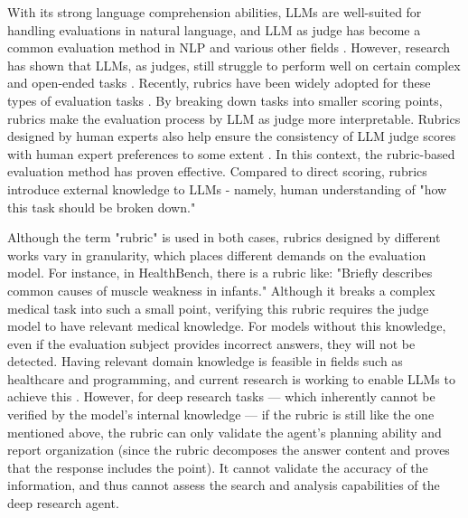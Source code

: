\documentclass[11pt]{article}
\begin{document}
With its strong language comprehension abilities, LLMs are well-suited for handling evaluations in natural language, and LLM as judge has become a common evaluation method in NLP and various other fields \citep{bavaresco2025llmsinsteadhumanjudges,gu2025surveyllmasajudge,zheng2023judgingllmasajudgemtbenchchatbot}. However, research has shown that LLMs, as judges, still struggle to perform well on certain complex and open-ended tasks \citep{li2025automatedcreativityevaluationlarge,chakrabarty2024artartificelargelanguage,marioriyad2025silentjudgeunacknowledgedshortcut,thakur2025judgingjudgesevaluatingalignment}. Recently, rubrics have been widely adopted for these types of evaluation tasks \citep{aroraHealthBenchEvaluatingLarge2025,lin2024wildbenchbenchmarkingllmschallenging,sirdeshmukh2025multichallengerealisticmultiturnconversation,starace2025paperbenchevaluatingaisability, gou2025mind2web2evaluatingagentic}. By breaking down tasks into smaller scoring points, rubrics make the evaluation process by LLM as judge more interpretable. Rubrics designed by human experts also help ensure the consistency of LLM judge scores with human expert preferences to some extent \citep{pathak2025rubricneedenhancingllmbased, Hashemi_2024}. In this context, the rubric-based evaluation method has proven effective. Compared to direct scoring, rubrics introduce external knowledge to LLMs - namely, human understanding of "how this task should be broken down."

Although the term "rubric" is used in both cases, rubrics designed by different works vary in granularity, which places different demands on the evaluation model. For instance, in HealthBench, there is a rubric like: "Briefly describes common causes of muscle weakness in infants." \citep{aroraHealthBenchEvaluatingLarge2025} Although it breaks a complex medical task into such a small point, verifying this rubric requires the judge model to have relevant medical knowledge. For models without this knowledge, even if the evaluation subject provides incorrect answers, they will not be detected. Having relevant domain knowledge is feasible in fields such as healthcare and programming, and current research is working to enable LLMs to achieve this \citep{huynh2025largelanguagemodelscode, Singhal2023LargeLM}. However, for deep research tasks — which inherently cannot be verified by the model’s internal knowledge — if the rubric is still like the one mentioned above, the rubric can only validate the agent's planning ability and report organization (since the rubric decomposes the answer content and proves that the response includes the point). It cannot validate the accuracy of the information, and thus cannot assess the search and analysis capabilities of the deep research agent.
\end{document}
